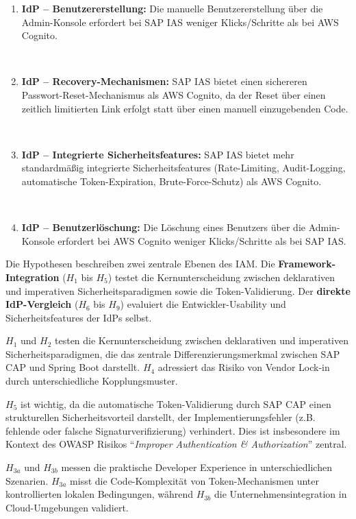 \begin{enumerate}
    \item[$H_6$] \textbf{IdP -- Benutzererstellung:} Die manuelle Benutzererstellung über die Admin-Konsole erfordert bei \ac{SAP IAS} weniger Klicks/Schritte als bei \ac{AWS} Cognito.

    \item[$H_7$] \textbf{IdP -- Recovery-Mechanismen:} \ac{SAP IAS} bietet einen sichereren Passwort-Reset-Mechanismus als \ac{AWS} Cognito, da der Reset über einen zeitlich limitierten Link erfolgt statt über einen manuell einzugebenden Code.

    \item[$H_8$] \textbf{IdP -- Integrierte Sicherheitsfeatures:} \ac{SAP IAS} bietet mehr standardmäßig integrierte Sicherheitsfeatures (Rate-Limiting, Audit-Logging, automatische Token-Expiration, Brute-Force-Schutz) als \ac{AWS} Cognito.

    \item[$H_9$] \textbf{IdP -- Benutzerlöschung:} Die Löschung eines Benutzers über die Admin-Konsole erfordert bei \ac{AWS} Cognito weniger Klicks/Schritte als bei \ac{SAP IAS}.
\end{enumerate}

Die Hypothesen beschreiben zwei zentrale Ebenen des \ac{IAM}. Die \textbf{Framework-Integration} ($H_1$ bis $H_5$) testet die Kernunterscheidung zwischen deklarativen und imperativen Sicherheitsparadigmen sowie die Token-Validierung. Der \textbf{direkte IdP-Vergleich} ($H_6$ bis $H_9$) evaluiert die Entwickler-Usability und Sicherheitsfeatures der \ac{IdP}s selbst.

$H_1$ und $H_2$ testen die Kernunterscheidung zwischen deklarativen und imperativen Sicherheitsparadigmen, die das zentrale Differenzierungsmerkmal zwischen \ac{SAP CAP} und Spring Boot darstellt. $H_4$ adressiert das Risiko von Vendor Lock-in durch unterschiedliche Kopplungsmuster.

$H_5$ ist wichtig, da die automatische Token-Validierung durch \ac{SAP CAP} einen strukturellen Sicherheitsvorteil darstellt, der Implementierungsfehler (z.B. fehlende oder falsche Signaturverifizierung) verhindert. Dies ist insbesondere im Kontext des \ac{OWASP} Risikos ``\textit{Improper Authentication \& Authorization}'' zentral.

$H_{3a}$ und $H_{3b}$ messen die praktische Developer Experience in unterschiedlichen Szenarien. $H_{3a}$ misst die Code-Komplexität von Token-Mechanismen unter kontrollierten lokalen Bedingungen, während $H_{3b}$ die Unternehmensintegration in Cloud-Umgebungen validiert.

